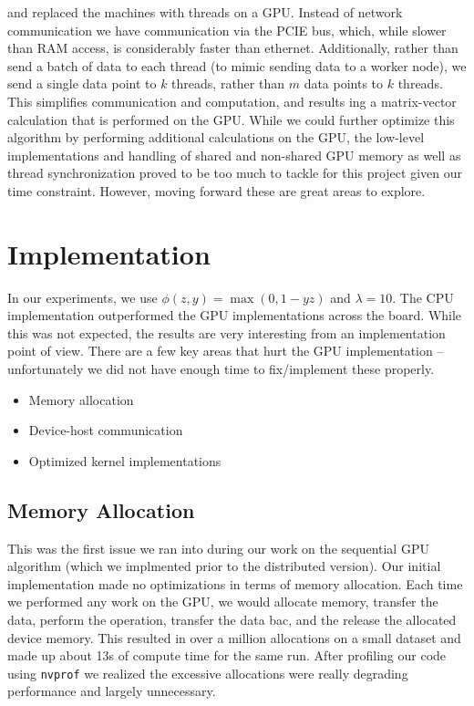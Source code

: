 \documentclass{article}
\begin{document}
and replaced the machines with threads on a GPU. Instead of network
communication we have communication via the PCIE bus, which, while slower than
RAM access, is considerably faster than ethernet. Additionally, rather than send
a batch of data to each thread (to mimic sending data to a worker node), we send
a single data point to $k$ threads, rather than $m$ data points to $k$ threads.
This simplifies communication and computation, and results ing a matrix-vector
calculation that is performed on the GPU. While we could further optimize this
algorithm by performing additional calculations on the GPU, the low-level
implementations and handling of shared and non-shared GPU memory as well as
thread synchronization proved to be too much to tackle for this project given
our time constraint. However, moving forward these are great areas to explore.

\section{Implementation}
In our experiments, we use $\phi(z,y)=\max(0,1-yz)$ and $\lambda=10$.
The CPU implementation outperformed
the GPU implementations across the board. While this was not expected, the
results are very interesting from an implementation point of view. There are a
few key areas that hurt the GPU implementation -- unfortunately we did not have
enough time to fix/implement these properly.
\begin{itemize}
	\item Memory allocation
	\item Device-host communication
	\item Optimized kernel implementations
\end{itemize}

\subsection{Memory Allocation}
This was the first issue we ran into during our work on the sequential GPU
algorithm (which we implmented prior to the distributed version). Our initial
implementation made no optimizations in terms of memory allocation. Each time
we performed any work on the GPU, we would allocate memory, transfer the data,
perform the operation, transfer the data bac, and the release the allocated
device memory. This resulted in over a million allocations on a small dataset
and made up about 13s of compute time for the same run. After profiling our
code using \texttt{nvprof} we realized the excessive allocations were really
degrading performance and largely unnecessary.\\
\end{document}
